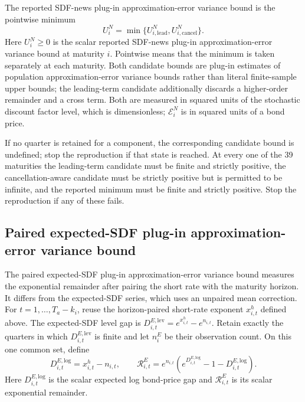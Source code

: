 \documentclass[11pt]{article}
\begin{document}
The reported SDF-news plug-in approximation-error variance bound is the pointwise minimum
\begin{equation*}
 U_i^N=\min\{U_{i,\mathrm{lead}}^N,U_{i,\mathrm{cancel}}^N\}.
\end{equation*}
Here \(U_i^N\ge0\) is the scalar reported SDF-news plug-in approximation-error variance bound at
maturity \(i\). Pointwise means that the minimum is taken separately at each maturity. Both candidate
bounds are plug-in estimates of population approximation-error variance bounds rather than literal
finite-sample upper bounds; the leading-term candidate additionally discards a higher-order remainder
and a cross term. Both are measured in squared units of the stochastic discount factor level, which is dimensionless; \(\mathcal E_i^N\) is in squared units of a bond price.

If no quarter is retained for a component, the corresponding candidate bound is undefined; stop the
reproduction if that state is reached. At every one of the 39 maturities the leading-term candidate
must be finite and strictly positive, the cancellation-aware candidate must be strictly positive but is permitted to be infinite, and the reported minimum must be finite and strictly positive. Stop the
reproduction if any of these fails.

\subsection{Paired expected-SDF plug-in approximation-error variance bound}

The paired expected-SDF plug-in approximation-error variance bound measures the exponential
remainder after pairing the short rate with the maturity horizon. It differs from the expected-SDF
series, which uses an unpaired mean correction. For \(t=1,\ldots,T_a-k_i\), reuse the horizon-paired
short-rate exponent \(x_{i,t}^h\) defined above. The expected-SDF level gap is
\(D_{i,t}^{E,\mathrm{lev}}=e^{x_{i,t}^h}-e^{n_{i,t}}\). Retain exactly the
quarters in which \(D_{i,t}^{E,\mathrm{lev}}\) is finite and let \(n_i^E\) be their observation
count. On this one common set, define
\begin{equation*}
 D_{i,t}^{E,\mathrm{log}}=x_{i,t}^h-n_{i,t},\qquad
 \mathcal R_{i,t}^{E}=e^{n_{i,t}}(e^{D_{i,t}^{E,\mathrm{log}}}-1-D_{i,t}^{E,\mathrm{log}}).
\end{equation*}
Here \(D_{i,t}^{E,\mathrm{log}}\) is the scalar expected log bond-price gap and
\(\mathcal R_{i,t}^E\) is its scalar exponential remainder.
\end{document}

